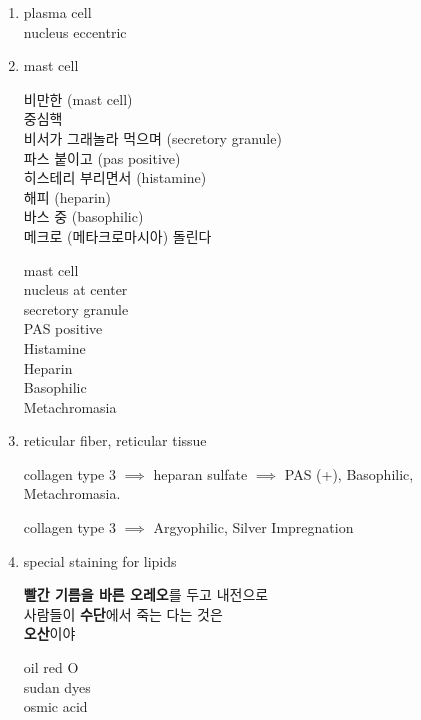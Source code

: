 \documentclass[10pt]{amsart}
\numberwithin{theorem}{section}
\numberwithin{example}{section}
\theoremstyle{definition}
\theoremstyle{remark}
\begin{document}
\begin{enumerate}
    \item  plasma cell  \\
    
    nucleus eccentric
\item mast cell

\begin{minipage}{0.4\textwidth}
비만한 (mast cell) \\
중심핵 \\
비서가 그래놀라 먹으며 (secretory granule) \\ 
파스 붙이고  (pas positive)  \\ 
히스테리 부리면서  (histamine)\\ 
해피  (heparin)  \\ 
바스 중  (basophilic)\\  
메크로  (메타크로마시아) 돌린다 \\ 
\end{minipage}
\hfill \vrule \hfill 
\begin{minipage}{0.4\textwidth}
mast cell \\
nucleus at center \\
secretory granule \\
PAS positive \\
Histamine \\
Heparin \\
Basophilic \\
Metachromasia
\end{minipage}

\item reticular fiber, reticular tissue 

collagen type 3 $\implies$ heparan sulfate $\implies$ PAS (+), Basophilic, Metachromasia. 

collagen type 3 $\implies$  Argyophilic, Silver Impregnation
\item special staining for lipids 

\begin{minipage}{0.4\textwidth}
\textbf{빨간 기름을 바른 오레오}를 두고  내전으로\\  사람들이  \textbf{수단}에서 죽는 다는 것은 \\
\textbf{오산}이야 
\end{minipage}
\hfill\vrule\hfill
\begin{minipage}{0.4\textwidth}
oil red O \\
sudan dyes \\
osmic acid 
\end{minipage}
\end{enumerate}
\end{document}
